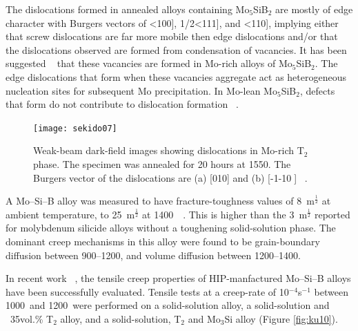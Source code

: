 The dislocations formed in annealed alloys containing Mo$_5$SiB$_2$ are mostly of edge character with Burgers vectors of <100], 1/2<111], and <110], implying either that screw dislocations are far more mobile then edge dislocations and/or that the dislocations observed are formed from condensation of vacancies.  It has been suggested ~\cite{sekido07} that these vacancies are formed in Mo-rich alloys of Mo$_5$SiB$_2$.  The edge dislocations that form when these vacancies aggregate act as heterogeneous nucleation sites for subsequent Mo precipitation.  In Mo-lean Mo$_5$SiB$_2$, defects that form do not contribute to dislocation formation ~\cite{sekido07}.

%
\begin{figure}[H]
\begin{center}
\texttt{[image: sekido07]}
\caption{ Weak-beam dark-field images showing dislocations in Mo-rich T$_2$ phase.  The specimen was annealed for 20 hours at 1550\celsius.  The Burgers vector of the dislocations are (a) [010] and (b) [-1-10􏰇] ~\cite{sekido07}.}
\label{fig:sekido07}
\end{center}
\end{figure} 
%

A Mo--Si--B alloy was measured to have fracture-toughness values of 8 \mega\pascal\,m$^{\frac{1}{2}}$ at ambient temperature, to 25 \mega\pascal\,m$^{\frac{1}{2}}$ at 1400\celsius\ ~\cite{alur06}.  This is higher than the 3 \mega\pascal\,m$^{\frac{1}{2}}$ reported for molybdenum silicide alloys without a toughening solid-solution phase.  The dominant creep mechanisms in this alloy were found to be grain-boundary diffusion between 900--1200\celsius, and volume diffusion between 1200--1400\celsius.

In recent work ~\cite{kumar10}, the tensile creep properties of HIP-manfactured Mo--Si--B alloys have been successfully evaluated.  Tensile tests at a creep-rate of 10$^{-4}$s$^{-1}$ between 1000\celsius\ and 1200\celsius\ were performed on a solid-solution alloy, a solid-solution and ~35vol.\% T$_2$ alloy, and a solid-solution, T$_2$ and Mo$_3$Si alloy (Figure \ref{fig:ku10}).


